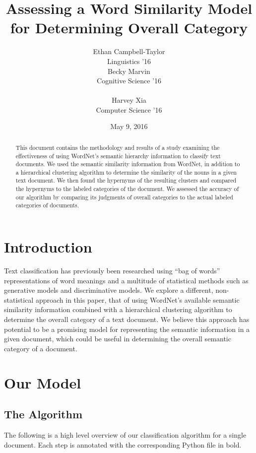 \documentclass[12pt]{article}
\title{Assessing a Word Similarity Model for Determining Overall Category}
\author{Ethan Campbell-Taylor \\
Linguistics '16\\\And
  Becky Marvin \\
  Cognitive Science '16 \\
  \\\And
  Harvey Xia \\
  Computer Science '16 \\}
\date{May 9, 2016}
\begin{document}
\maketitle
\begin{abstract}
  This document contains the methodology and results of a study examining the effectiveness of using WordNet's semantic hierarchy information to classify text documents. We used the semantic similarity information from WordNet, in addition to a hierarchical clustering algorithm to determine the similarity of the nouns in a given text document. We then found the hypernyms of the resulting clusters and compared the hypernyms to the labeled categories of the document. We assessed the accuracy of our algorithm by comparing its judgments of overall categories to the actual labeled categories of documents.
\end{abstract}

\section{Introduction}

Text classification has previously been researched using ``bag of words'' representations of word meanings and a multitude of statistical methods such as generative models and discriminative models. We explore a different, non-statistical approach in this paper, that of using WordNet's available semantic similarity information combined with a hierarchical clustering algorithm to determine the overall category of a text document. We believe this approach has potential to be a promising model for representing the semantic information in a given document, which could be useful in determining the overall semantic category of a document.

\section{Our Model}

\subsection{The Algorithm}

The following is a high level overview of our classification algorithm for a single document. Each step is annotated with the corresponding Python file in bold.
\end{document}
